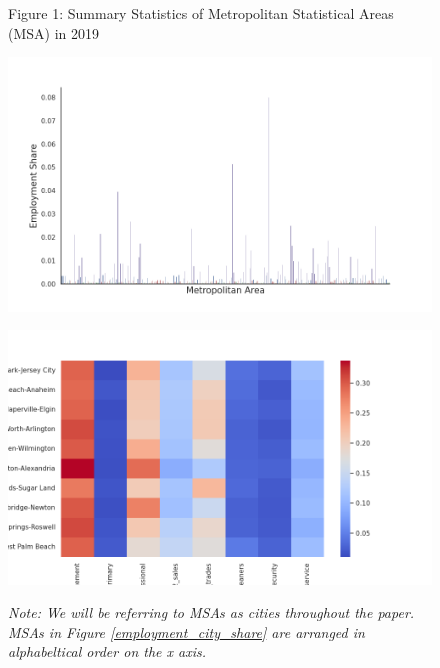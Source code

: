 \documentclass[10pt]{article}
\begin{document}
\begin{figure}[!htb]
    \centering
    Figure 1: Summary Statistics of Metropolitan Statistical Areas (MSA) in 2019\par\medskip
    \begin{minipage}{0.48\textwidth}
        \centering
        \includegraphics[width=\textwidth]{../../estimations/graphs/city_employment_share.png}
        \label{employment_city_share}
    \end{minipage}\hfill
    \begin{minipage}{0.48\textwidth}
        \centering
        \includegraphics[width=\textwidth]{../../estimations/graphs/top_25_city_heatmap.png}
        \label{top_25_city_heatmap}
    \end{minipage}
    \caption*{\small\textit{Note: We will be referring to MSAs as cities throughout the paper. MSAs in Figure \ref{employment_city_share} are arranged in alphabeltical order on the x axis.}}
\end{figure}
\end{document}
